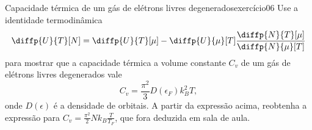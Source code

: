\begin{exercício}{Capacidade térmica de um gás de elétrons livres degenerados}{exercício06}
    Use a identidade termodinâmica
    \begin{equation*}
        \diffp{U}{T}[N] = \diffp{U}{T}[\mu] - \diffp{U}{\mu}[T] \frac{\diffp{N}{T}[\mu]}{\diffp{N}{\mu}[T]}
    \end{equation*}
    para mostrar que a capacidade térmica a volume constante \(C_v\) de um gás de elétrons livres degenerados vale
    \begin{equation*}
        C_v = \frac{\pi^2}{3} D(\epsilon_F) k_B^2T,
    \end{equation*}
    onde \(D(\epsilon)\) é a densidade de orbitais. A partir da expressão acima, reobtenha a expressão para \(C_v = \frac{\pi^2}{2} N k_B \frac{T}{T_F}\), que fora deduzida em sala de aula.
\end{exercício}
